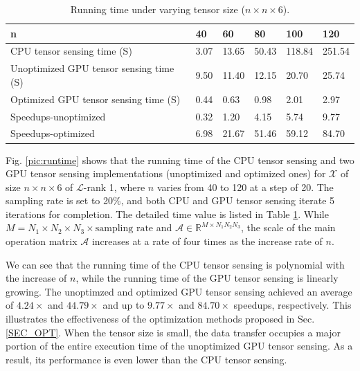 \documentclass[futureinternet,article,submit,moreauthors,pdftex,10pt,a4paper]{Definitions/mdpi}
\theoremstyle{plain}
\theoremstyle{definition}
\theoremstyle{remark}
\begin{document}
\begin{table}[t]
  \renewcommand{\arraystretch}{1.3}
  \centering
  \scriptsize
  \caption{Running time under varying tensor size ($n \times n \times 6$).}
  \begin{tabular}{|l|l|l|l|l|l|}
    \hline
    \textbf{\textbf{n}} & \textbf{40}& \textbf{60}& \textbf{80} & \textbf{100} & \textbf{120}\\
    \hline
    CPU tensor sensing time (S) & 3.07 & 13.65 & 50.43 & 118.84 & 251.54\\
    \hline
    Unoptimized GPU tensor sensing time (S) & 9.50 & 11.40 & 12.15 & 20.70 & 25.74\\
    \hline
    Optimized GPU tensor sensing time (S) & 0.44 & 0.63 & 0.98 & 2.01 & 2.97\\
    \hline
    Speedups-unoptimized & 0.32 & 1.20 & 4.15 & 5.74 & 9.77\\
    \hline
    Speedups-optimized & 6.98 & 21.67 & 51.46 & 59.12 & 84.70\\
    \hline
  \end{tabular}
  \label{tbl_runtime}
\end{table}

Fig. \ref{pic:runtime} shows that the running time of the CPU tensor sensing and two GPU tensor sensing implementations (unoptimized and optimized ones) for $\mathcal{X}$ of size $n\times n \times 6$ of $\mathcal{L}$-rank 1, where $n$ varies from 40 to 120 at a step of 20. The sampling rate is set to 20\%, and both CPU and GPU tensor sensing iterate 5 iterations for completion. The detailed time value is listed in Table \ref{tbl_runtime}. 
While $M = N_1 \times N_2 \times N_3 \times \text{sampling rate}$ and $\mathcal{A} \in \mathbb{R}^{M \times N_1N_2N_3}$, the scale of the main operation matrix $\mathcal{A}$ increases at a rate of four times as the increase rate of $n$. 

We can see that the running time of the CPU tensor sensing is polynomial with the increase of $n$, while the running time of the GPU tensor sensing is linearly growing. The unoptimzed and optimized GPU tensor sensing achieved an average of $4.24 \times$ and $44.79 \times$ and up to $9.77 \times$ and $84.70 \times$ speedups, respectively. This illustrates the effectiveness of the optimization methods proposed in Sec. \ref{SEC_OPT}. When the tensor size is small, the data transfer occupies a major portion of the entire execution time of the unoptimized GPU tensor sensing. As a result, its performance is even lower than the CPU tensor sensing.
\end{document}
